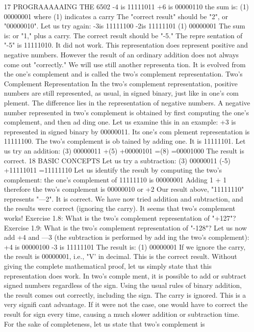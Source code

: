 17
PROGRAAAAAING THE 6502
-4 is 11111011
+6 is 00000110
the sum is: (1) 00000001 where (1) indicates a
carry
The "correct result" should be "2", or "00000010".
Let us try again:
-3is 11111100
-2is 11111101
(1) 00000001
The sum is:
or "1," plus a carry. The correct result should be "-5." The repre
sentation of "-5" is 11111010. It did not work.
This representation does represent positive and negative
numbers. However the result of an ordinary addition does not
always come out "correctly." We will use still another representa
tion. It is evolved from the one's complement and is called the
two's complement representation.
Two's Complement Representation
In the two's complement representation, positive numbers are
still represented, as usual, in signed binary, just like in one's com
plement. The difference lies in the representation of negative
numbers. A negative number represented in two's complement is
obtained by first computing the one's complement, and then ad
ding one. Let us examine this in an example:
+3 is represented in signed binary by 00000011. Its one's com
plement representation is 11111100. The two's complement is ob
tained by adding one. It is 11111101.
Let us try an addition:
(3) 00000011
+(5) +00000101
=(8) =00001000
The result is correct.
18
BASIC CONCEPTS
Let us try a subtraction:
(3) 00000011
(-5) +11111011
=11111110
Let us identify the result by computing the two's complement:
the one's complement of 11111110 is 00000001
Adding 1 + 1
therefore the two's complement is 00000010 or +2
Our result above, "11111110" represents "—2". It is correct.
We have now tried addition and subtraction, and the results were correct
(ignoring the carry). It seems that two's complement works!
Exercise 1.8: What is the two's complement representation of "+127"?
Exercise 1.9: What is the two's complement representation of "-128"?
Let us now add +4 and —3 (the subtraction is performed by add
ing the two's complement):
+4 is 00000100
-3 is 11111101
The result is: (1) 00000001
If we ignore the carry, the result is 00000001, i.e., "V' in decimal. This
is the correct result. Without giving the complete mathematical proof,
let us simply state that this representation does work. In two's comple
ment, it is possible to add or subtract signed numbers regardless of the
sign. Using the usual rules of binary addition, the result comes out
correctly, including the sign. The carry is ignored. This is a very signifi
cant advantage. If it were not the case, one would have to correct the
result for sign every time, causing a much slower addition or subtraction
time.
For the sake of completeness, let us state that two's complement is
